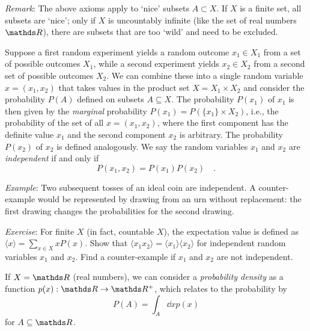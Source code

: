 \documentclass{notebook}
\makeatletter
\newcommand{\Remark}{\textit{Remark}} %
\newcommand{\Example}{\textit{Example}}
\newcommand{\Exercise}{\textit{Exercise}}
\makeatother
\begin{document}
\Remark: The above axioms apply to `nice' subsets $A\subset X$. If $X$ is a finite set, all subsets are `nice'; only if $X$ is uncountably infinite (like the set of real numbers $\R$), there are subsets that are too `wild' and need to be excluded.


\begin{theorem}
Suppose a first random experiment yields a random outcome $x_1\in X_1$ from a set of possible outcomes $X_1$,
while a second experiment yields $x_2\in X_2$ from a second set of possible outcomes $X_2$.
We can combine these into a single random variable $x=(x_1,x_2)$ that takes values in the 
product set $X=X_1 \times X_2$ and consider the probability $P(A)$ defined on subsets $A\subseteq X$.
The probability $P(x_1)$ of $x_1$ is then given by the \textit{marginal} probability
$P(x_1)=P(\{x_1\}\times X_2)$, i.e., 
the probability of the set of all $x=(x_1,x_2)$,
where the first component has the definite value $x_1$ and the second component $x_2$ is arbitrary.
The probability $P(x_2)$ of $x_2$ is defined analogously. 
We say the random variables $x_1$ and $x_2$ are \textit{independent} if and only if
\begin{equation}
P(x_1,x_2) = P(x_1)P(x_2) \quad. 
\end{equation}
\end{theorem}

\Example: 
Two subsequent tosses of an ideal coin are independent.
A counter-example would be represented by drawing from an urn without replacement:
the first drawing changes the probabilities for the second drawing.

\Exercise:
For finite $X$ (in fact, countable $X$), 
the expectation value is defined as
$\langle x\rangle=\sum_{x\in X} x P(x)$.
Show that 
$\langle x_1 x_2 \rangle = \langle x_1 \rangle \langle x_2 \rangle$
for independent random variables $x_1$ and $x_2$.
Find a counter-example if $x_1$ and $x_2$ are not independent.

If $X = \R$ (real numbers), we can consider a \textit{probability density} 
as a function $p(x) : \R \to \R^+$, which relates to the probability by
%
\begin{equation}
\label{eq:def_P}
P(A) = \int_A{\dd{x} p(x)}
\end{equation}
%
for $A \subseteq \R$. 
\end{document}

